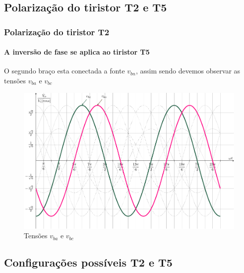 \documentclass[aspectratio=43]{beamer}
\begin{document}
\subsection{Polarização do tiristor T2 e T5}
\begin{frame}
	\frametitle{Polarização do tiristor T2}
	\framesubtitle{A inversão de fase se aplica ao tiristor T5}
	
O segundo braço esta conectada a fonte $v_{bn}$, assim sendo devemos observar as tensões $v_{ba}$ e $v_{bc}$
\begin{figure}
	\centering
	\includegraphics[width=0.6\linewidth]{figuras/SenosDrawSEQnT2T5}
	\caption{Tensões  $v_{ba}$ e $v_{bc}$}
	\label{fig:SenosDrawSEQnT2T5}
\end{figure}
\end{frame}


\subsection{Configurações possíveis T2 e T5}
\end{document}
